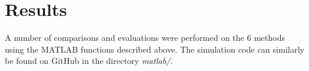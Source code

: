 \section{Results}

A number of  comparisons  and  evaluations were performed on the 6 methods using
the MATLAB functions described above. The simulation code can similarly be found
on GitHub\cite{ref:TheComet93} in the directory \textit{matlab/}.




